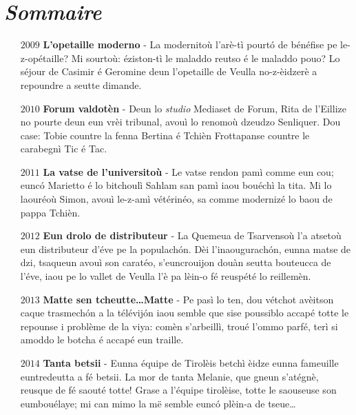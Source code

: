 \chapter*{\textit{Sommaire}}

\begin{itemize}
\item[$2009$] \textbf{L'opetaille moderno} - La modernitoù l'arè-tì pourt\'o de bénéfise pe le-z-opétaille? Mi sourtoù: éziston-tì le maladdo reutso é le maladdo pouo? Lo séjour de Casimir é Geromine deun l'opetaille de Veulla no-z-èidzerè a repoundre a seutte dimande.\newline
\item[$2010$] \textbf{Forum valdotèn} - Deun lo \textit{studio} Mediaset de Forum, Rita de l'Eillize no pourte deun eun vrèi tribunal, avouì lo renomoù dzeudzo Senliquer. Dou case: Tobie countre la fenna Bertina é Tchièn Frottapanse countre le carabegnì Tic é Tac.\newline

\item[$2011$] \textbf{La vatse de l'universitoù} - Le vatse rendon pamì com\-me eun cou; eunc\'o Marietto é lo bitchoulì Sahlam san pamì iaou bouéchì la tita. Mi lo laouréoù Simon, avouì le-z-amì vétérinéo, sa comme modernizé lo baou de pappa Tchièn. \newline

\item[$2012$] \textbf{Eun drolo de distributeur} - La Quemeua de Tsarvensoù l'a atsetoù eun distributeur d'éve pe la populach\'on. Dèi l'inaougurach\'on, eunna matse de dzi, tsaqueun avouì son caratéo, s'euncrouijon douàn seutta bouteucca de l'éve, iaou pe lo vallet de Veulla l'è pa lèin-o fé reuspété lo reillemèn.
\newline

\item[$2013$] \textbf{Matte sen tcheutte\ldots Matte} - Pe pasì lo ten, dou vé\-tchot avèitson caque trasmech\'on a la télévij\'on iaou sem\-ble que sise poussiblo accapé totte le repounse i problème de la viya: comèn s'arbeillì, troué l'ommo parfé, terì si amoddo le bo\-tcha é accapé eun traille.\newline

\item[$2014$] \textbf{Tanta betsii} - Eunna équipe de Tirolèis betchì èidze eunna fameuille euntredeutta a fé betsii. La mor de tanta Melanie, que gneun s'atégnè, reusque de fé saouté totte! Grase a l'équipe tirolèise, totte le saouseuse son eumbouélaye; mi can mimo la më semble eunc\'o plèin-a de tseue\ldots\newline


\end{itemize}

